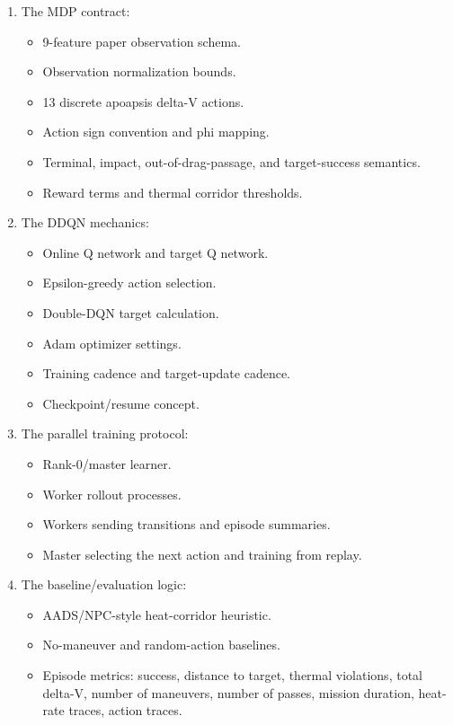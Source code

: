 \documentclass[11pt]{article}
\begin{document}
\begin{enumerate}
\item The MDP contract:
\begin{itemize}
\item 9-feature paper observation schema.
\item Observation normalization bounds.
\item 13 discrete apoapsis delta-V actions.
\item Action sign convention and phi mapping.
\item Terminal, impact, out-of-drag-passage, and target-success semantics.
\item Reward terms and thermal corridor thresholds.

\end{itemize}
\item The DDQN mechanics:
\begin{itemize}
\item Online Q network and target Q network.
\item Epsilon-greedy action selection.
\item Double-DQN target calculation.
\item Adam optimizer settings.
\item Training cadence and target-update cadence.
\item Checkpoint/resume concept.

\end{itemize}
\item The parallel training protocol:
\begin{itemize}
\item Rank-0/master learner.
\item Worker rollout processes.
\item Workers sending transitions and episode summaries.
\item Master selecting the next action and training from replay.

\end{itemize}
\item The baseline/evaluation logic:
\begin{itemize}
\item AADS/NPC-style heat-corridor heuristic.
\item No-maneuver and random-action baselines.
\item Episode metrics: success, distance to target, thermal violations, total delta-V, number of maneuvers, number of passes, mission duration, heat-rate traces, action traces.
\end{itemize}
\end{enumerate}
\end{document}
